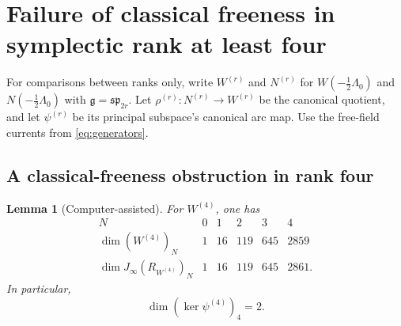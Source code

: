 \documentclass[11pt]{amsart}
\newtheorem{lemma}[theorem]{Lemma}
\theoremstyle{definition}
\newtheorem{conjecture}[theorem]{Conjecture}
\theoremstyle{remark}
\newcommand{\g}{\mathfrak g}
\newcommand{\spalg}{\mathfrak{sp}}
\begin{document}

\color{black}

\section{Failure of classical freeness in symplectic rank at least four}
\label{sec:higher-rank}
For comparisons between ranks only, write $W^{(r)}$ and $N^{(r)}$ for
$W(-\frac12\Lambda_0)$ and $N(-\frac12\Lambda_0)$ with
$\g=\spalg_{2r}$. Let $\rho^{(r)}:N^{(r)}\to W^{(r)}$ be the
canonical quotient, and let $\psi^{(r)}$ be its principal subspace's
canonical arc map. Use the free-field currents from
\eqref{eq:generators}.

\subsection{A classical-freeness obstruction in rank four}

\begin{lemma}[Computer-assisted]
\label{lem:C4-computation}
For \(W^{(4)}\), one has
\[
\begin{array}{c|rrrrr}
N&0&1&2&3&4\\ \hline
\dim(W^{(4)})_N&1&16&119&645&2859\\
\dim J_\infty(R_{W^{(4)}})_N&1&16&119&645&2861.
\end{array}
\]
In particular,
\[
\dim(\ker\psi^{(4)})_4=2.
\]
\end{lemma}
\end{document}
